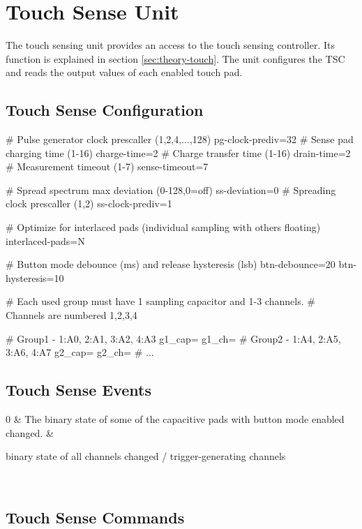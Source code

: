 \section{Touch Sense Unit}

The touch sensing unit provides an access to the touch sensing controller. Its function is explained in section \ref{sec:theory-touch}. The unit configures the TSC and reads the output values of each enabled touch pad.


\subsection{Touch Sense Configuration}

\begin{inicode}
# Pulse generator clock prescaller (1,2,4,...,128)
pg-clock-prediv=32
# Sense pad charging time (1-16)
charge-time=2
# Charge transfer time (1-16)
drain-time=2
# Measurement timeout (1-7)
sense-timeout=7

# Spread spectrum max deviation (0-128,0=off)
ss-deviation=0
# Spreading clock prescaller (1,2)
ss-clock-prediv=1

# Optimize for interlaced pads (individual sampling with others floating)
interlaced-pads=N

# Button mode debounce (ms) and release hysteresis (lsb)
btn-debounce=20
btn-hysteresis=10

# Each used group must have 1 sampling capacitor and 1-3 channels.
# Channels are numbered 1,2,3,4

# Group1 - 1:A0, 2:A1, 3:A2, 4:A3
g1_cap=
g1_ch=
# Group2 - 1:A4, 2:A5, 3:A6, 4:A7
g2_cap=
g2_ch=
# ...
\end{inicode}


\subsection{Touch Sense Events}

\begin{cmdlist}
    0 & 
    The binary state of some of the capacitive pads with button mode enabled changed.
    & \begin{cmdpld}
         binary state of all channels
         changed / trigger-generating channels
    \end{cmdpld} \\
\end{cmdlist}

\subsection{Touch Sense Commands}

